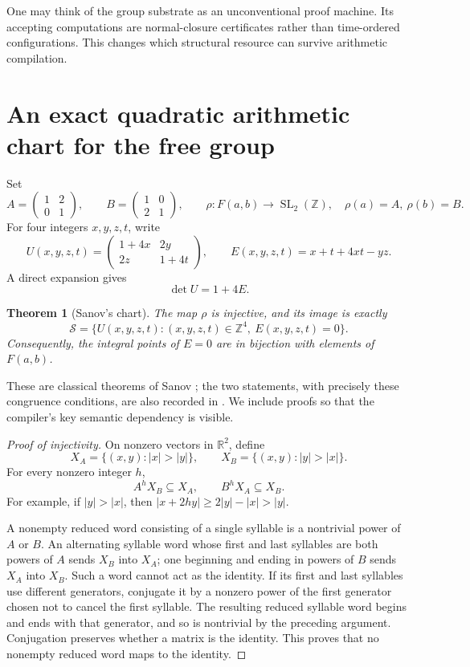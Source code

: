 \documentclass[11pt,letterpaper]{article}
\newtheorem{theorem}{Theorem}[section]
\theoremstyle{definition}
\theoremstyle{remark}
\newcommand{\Z}{\mathbb Z}
\newcommand{\R}{\mathbb R}
\newcommand{\F}{F(a,b)}
\newcommand{\San}{\mathcal S}
\newcommand{\SL}{\operatorname{SL}}
\newcommand{\smallmat}[4]{\begin{pmatrix}#1&#2\\#3&#4\end{pmatrix}}
\begin{document}
One may think of the group substrate as an unconventional proof machine. Its accepting computations are normal-closure certificates rather than time-ordered configurations. This changes which structural resource can survive arithmetic compilation.

\section{An exact quadratic arithmetic chart for the free group}\label{gts:vk:sec:chart}

Set
\begin{equation}\label{gts:vk:eq:shears}
 A=\smallmat{1}{2}{0}{1},\qquad
 B=\smallmat{1}{0}{2}{1},\qquad
 \rho:\F\longrightarrow\SL_2(\Z),\quad \rho(a)=A,\ \rho(b)=B.
\end{equation}
For four integers $x,y,z,t$, write
\begin{equation}\label{gts:vk:eq:chart}
 U(x,y,z,t)=\smallmat{1+4x}{2y}{2z}{1+4t},\qquad
 E(x,y,z,t)=x+t+4xt-yz.
\end{equation}
A direct expansion gives
\begin{equation}\label{gts:vk:eq:det-chart}
 \det U=1+4E.
\end{equation}

\begin{theorem}[Sanov's chart]\label{gts:vk:thm:sanov}
The map $\rho$ is injective, and its image is exactly
\begin{equation}\label{gts:vk:eq:San}
 \San=\{U(x,y,z,t):(x,y,z,t)\in\Z^4,\ E(x,y,z,t)=0\}.
\end{equation}
Consequently, the integral points of $E=0$ are in bijection with elements of $\F$.
\end{theorem}

These are classical theorems of Sanov \cite{sanov}; the two statements, with precisely these congruence conditions, are also recorded in \cite[Theorems~1--2]{chorna}. We include proofs so that the compiler's key semantic dependency is visible.

\begin{proof}[Proof of injectivity]
On nonzero vectors in $\R^2$, define
\[
 X_A=\{(x,y):|x|>|y|\},\qquad X_B=\{(x,y):|y|>|x|\}.
\]
For every nonzero integer $h$,
\[
 A^h X_B\subseteq X_A,\qquad B^h X_A\subseteq X_B.
\]
For example, if $|y|>|x|$, then
$|x+2hy|\geq2|y|-|x|>|y|$.

A nonempty reduced word consisting of a single syllable is a nontrivial power of $A$ or $B$. An alternating syllable word whose first and last syllables are both powers of $A$ sends $X_B$ into $X_A$; one beginning and ending in powers of $B$ sends $X_A$ into $X_B$. Such a word cannot act as the identity. If its first and last syllables use different generators, conjugate it by a nonzero power of the first generator chosen not to cancel the first syllable. The resulting reduced syllable word begins and ends with that generator, and so is nontrivial by the preceding argument. Conjugation preserves whether a matrix is the identity. This proves that no nonempty reduced word maps to the identity.
\end{proof}
\end{document}

